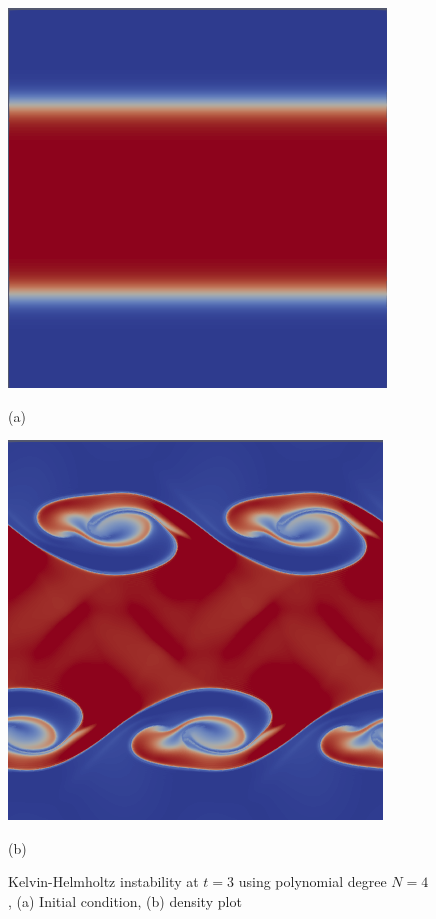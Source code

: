 \begin{figure}[!ht]
    \centering
    \begin{minipage}{0.5\textwidth}
        \centering
        \includegraphics[width=0.9\linewidth]{attachments/kelvin_8.0000.png}
        \caption*{(a)}
    \end{minipage}%
    \begin{minipage}{0.5\textwidth}
        \centering
        \includegraphics[width=0.9\linewidth]{attachments/kelvin_8.0264.png}
        \caption*{(b)}
    \end{minipage}
    \caption{Kelvin-Helmholtz instability at $t = 3$ using polynomial degree $N = 4$, (a) Initial condition, (b) density plot}
\end{figure}

